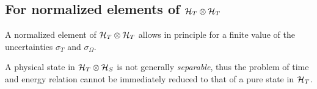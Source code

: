 \subsection{For normalized elements of $\mathcal{H}_T \otimes \mathcal{H}_T$}\label{sec:for-normalized-elements}

A normalized element of $\mathcal{H}_T \otimes \mathcal{H}_T$ allows in principle for a finite value
of the uncertainties $\sigma_{T}$ and $\sigma_{\Omega}$.

A physical state in $\mathcal{H}_T \otimes \mathcal{H}_S$ is not generally
\emph{separable},
thus
the problem of time and energy relation cannot be immediately reduced to that of
a pure state in $\mathcal{H}_T$.

%
%
%
